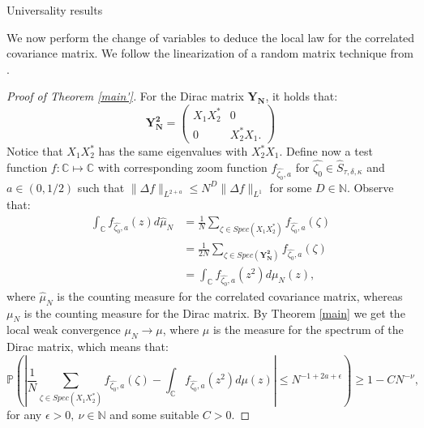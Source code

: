 \documentclass[11pt, a4paper, oneside]{book}
\numberwithin{equation}{chapter}
\newcommand{\beq}{\begin{equation}}
\newcommand{\eeq}{\end{equation}}
\begin{document}
\begin{section}{Universality results}

We now perform the change of variables to deduce the local law for the correlated covariance matrix. We follow the linearization of a random matrix technique from \cite{o2015products}.
%
\begin{proof}[Proof of Theorem \ref{main'}]
For the Dirac matrix $\mathbf{Y_N}$, it holds that:
\[
\mathbf{Y^2_N} = \begin{pmatrix}
    X_1 X_2^* & 0 \\ 0 & X_2^*X_1 .
\end{pmatrix}
\]
Notice that $X_1X_2^*$ has the same eigenvalues with $X_2^* X_1 $. Define now a test function $f: \mathbb{C}\mapsto \mathbb{C}$ with corresponding zoom function $f_{\widehat{\zeta_0},a}$ for $\widehat{\zeta_0} \in \widehat{S}_{\tau,\delta,\kappa}$ and $a\in (0,1/2)$ such that $\|\Delta f\|_{L^{2+a}} \leq N^D \|\Delta f \|_{L^1}$ for some $D \in \mathbb{N}$. Observe that:
%
\begin{align*}
\int_{\mathbb{C}} f_{\widehat{\zeta_0},a} (z) d \widehat{\mu}_N &= \frac{1}{N}  \sum \limits_{\zeta \in Spec(X_1X_2^*)} f_{\widehat{\zeta_0},a} (\zeta) \\
&= \frac{1}{2N} \sum \limits_{\zeta \in Spec(\mathbf{Y^2_N})} f_{\widehat{\zeta_0},a} (\zeta)\\
&= \int_{\mathbb{C}} f_{\widehat{\zeta_0},a} (z^2) d\mu_N (z),
\end{align*}
where $\widehat{\mu}_N$ is the counting measure for the correlated covariance matrix, whereas $\mu_N$ is the counting measure for the Dirac matrix. By Theorem \ref{main} we get the local weak convergence $\mu_N \to \mu$, where $\mu$ is the measure for the spectrum of the Dirac matrix, which means that:
\beq \label{prob-ineq}
\mathbb{P} \left ( \left | \frac{1}{N} \sum_{\zeta \in Spec(X_1X_2^*) }f_{\widehat{\zeta_0},a}( \zeta)   - \int_{\mathbb{C}} f_{\widehat{\zeta_0},a} (z^2) d\mu(z) \right | \leq N^{-1+2a+\epsilon} \right ) \geq 1 - CN^{-\nu},
\eeq
for any $\epsilon>0,\ \nu \in \mathbb{N}$ and some suitable $C>0$.


\end{proof}
\end{section}
\end{document}
